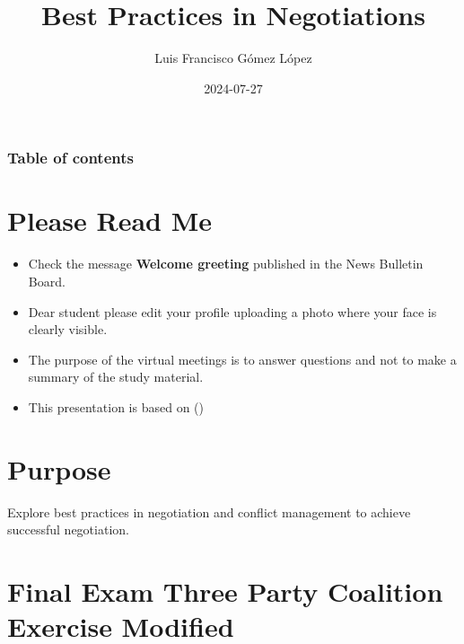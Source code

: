 \documentclass[
  ignorenonframetext,
]{beamer}
\title{Best Practices in Negotiations}
\author{Luis Francisco Gómez López}
\date{2024-07-27}
\institute{FAEDIS}
\renewcommand*\contentsname{Table of contents}
\newcommand\contentsname{Table of contents}
\begin{document}
\frame{\titlepage}

\renewcommand*\contentsname{Table of contents}
\begin{frame}[allowframebreaks]
  \frametitle{Table of contents}
  \tableofcontents[hideallsubsections]
\end{frame}

\section{Please Read Me}\label{please-read-me}

\begin{frame}{}
\label{section}
\begin{itemize}
\item
  Check the message \textbf{Welcome greeting} published in the News
  Bulletin Board.
\item
  Dear student please edit your profile uploading a photo where your
  face is clearly visible.
\item
  The purpose of the virtual meetings is to answer questions and not to
  make a summary of the study material.
\item
  This presentation is based on
  ()
\end{itemize}
\end{frame}

\section{Purpose}\label{purpose}

\begin{frame}{}
\label{section-1}
Explore best practices in negotiation and conflict management to achieve
successful negotiation.
\end{frame}

\section{Final Exam Three Party Coalition Exercise
Modified}\label{final-exam-three-party-coalition-exercise-modified}
\end{document}
